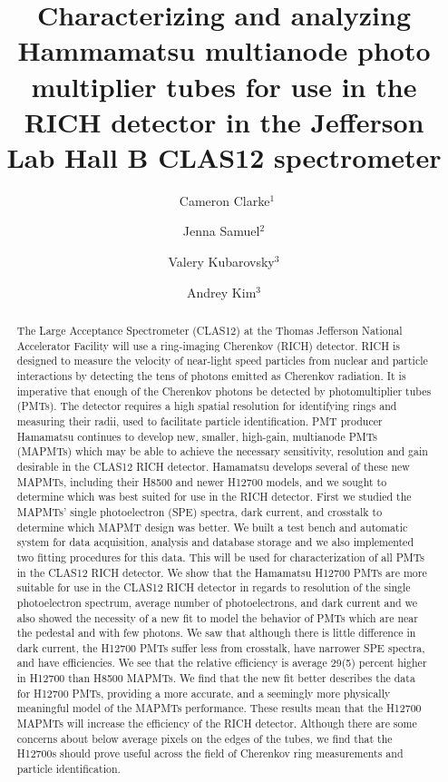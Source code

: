 \documentclass[prc,twocolumn]{revtex4}
\begin{document}
\title{Characterizing and analyzing Hammamatsu multianode photo multiplier tubes for use in the RICH detector in the Jefferson Lab Hall B CLAS12 spectrometer}

\author{~Cameron Clarke$^1$}
\author{Jenna Samuel$^2$}
\author{Valery Kubarovsky$^3$}
\author{Andrey Kim$^3$}

\begin{abstract}
	
	The Large Acceptance Spectrometer (CLAS12) at the Thomas Jefferson National Accelerator Facility will use a ring-imaging Cherenkov (RICH) detector. RICH is designed to measure the velocity of near-light speed particles from nuclear and particle interactions by detecting the tens of photons emitted as Cherenkov radiation. It is imperative that enough of the Cherenkov photons be detected by photomultiplier tubes (PMTs). The detector requires a high spatial resolution for identifying rings and measuring their radii, used to facilitate particle identification. PMT producer Hamamatsu continues to develop new, smaller, high-gain, multianode PMTs (MAPMTs) which may be able to achieve the necessary sensitivity, resolution and gain desirable in the CLAS12 RICH detector. Hamamatsu develops several of these new MAPMTs, including their H8500 and newer H12700 models, and we sought to determine which was best suited for use in the RICH detector. First we studied the MAPMTs' single photoelectron (SPE) spectra, dark current, and crosstalk to determine which MAPMT design was better. We built a test bench and automatic system for data acquisition, analysis and database storage and we also implemented two fitting procedures for this data. This will be used for characterization of all PMTs in the CLAS12 RICH detector. We show that the Hamamatsu H12700 PMTs are more suitable for use in the CLAS12 RICH detector in regards to resolution of the single photoelectron spectrum, average number of photoelectrons, and dark current and we also showed the necessity of a new fit to model the behavior of PMTs which are near the pedestal and with few photons. We saw that although there is little difference in dark current, the H12700 PMTs suffer less from crosstalk, have narrower SPE spectra, and have efficiencies. We see that the relative efficiency is average 29(5) percent higher in H12700 than H8500 MAPMTs. We find that the new fit better describes the data for H12700 PMTs, providing a more accurate, and a seemingly more physically meaningful model of the MAPMTs performance. These results mean that the H12700 MAPMTs will increase the efficiency of the RICH detector. Although there are some concerns about below average pixels on the edges of the tubes, we find that the H12700s should prove useful across the field of Cherenkov ring measurements and particle identification.
	
\end{abstract}
\end{document}
